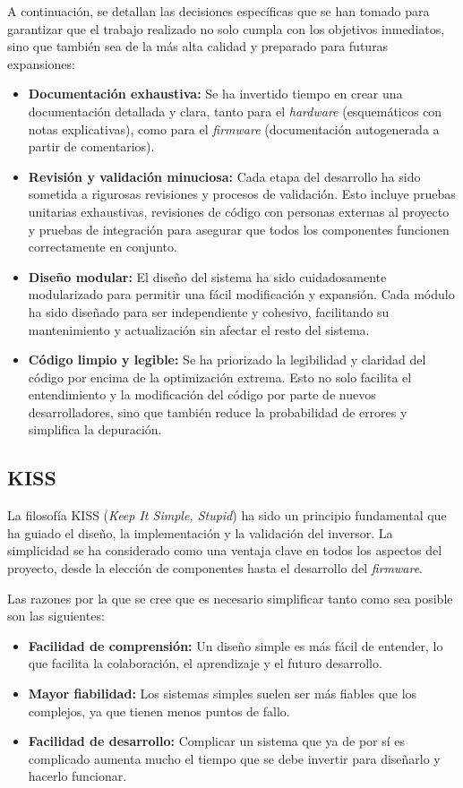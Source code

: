 A continuación, se detallan las decisiones específicas que se han tomado para garantizar que el trabajo realizado no solo cumpla con los objetivos inmediatos, sino que también sea de la más alta calidad y preparado para futuras expansiones:

\begin{itemize}
	\item \textbf{Documentación exhaustiva:} Se ha invertido tiempo en crear una documentación detallada y clara, tanto para el \textit{hardware} (esquemáticos con notas explicativas), como para el \textit{firmware} (documentación autogenerada a partir de comentarios).
	
	\item \textbf{Revisión y validación minuciosa:} Cada etapa del desarrollo ha sido sometida a rigurosas revisiones y procesos de validación. Esto incluye pruebas unitarias exhaustivas, revisiones de código con personas externas al proyecto y pruebas de integración para asegurar que todos los componentes funcionen correctamente en conjunto.
	
	\item \textbf{Diseño modular:} El diseño del sistema ha sido cuidadosamente modularizado para permitir una fácil modificación y expansión. Cada módulo ha sido diseñado para ser independiente y cohesivo, facilitando su mantenimiento y actualización sin afectar el resto del sistema.
	
	\item \textbf{Código limpio y legible:} Se ha priorizado la legibilidad y claridad del código por encima de la optimización extrema. Esto no solo facilita el entendimiento y la modificación del código por parte de nuevos desarrolladores, sino que también reduce la probabilidad de errores y simplifica la depuración.
\end{itemize}

\subsection{KISS}
La filosofía KISS (\textit{Keep It Simple, Stupid}) ha sido un principio fundamental que ha guiado el diseño, la implementación y la validación del inversor. La simplicidad se ha considerado como una ventaja clave en todos los aspectos del proyecto, desde la elección de componentes hasta el desarrollo del \textit{firmware}.

Las razones por la que se cree que es necesario simplificar tanto como sea posible son las siguientes:
\begin{itemize}
	\item \textbf{Facilidad de comprensión:} Un diseño simple es más fácil de entender, lo que facilita la colaboración, el aprendizaje y el futuro desarrollo.
	\item \textbf{Mayor fiabilidad:} Los sistemas simples suelen ser más fiables que los complejos, ya que tienen menos puntos de fallo.
	\item \textbf{Facilidad de desarrollo:} Complicar un sistema que ya de por sí es complicado aumenta mucho el tiempo que se debe invertir para diseñarlo y hacerlo funcionar.
\end{itemize}


